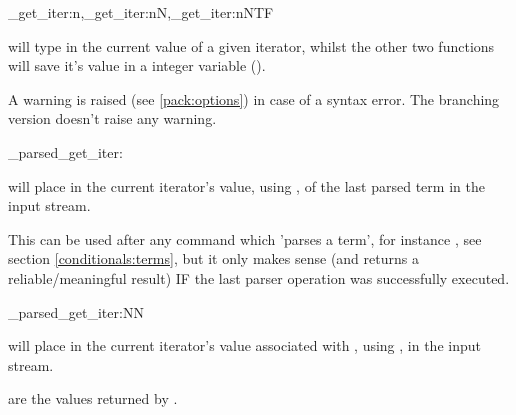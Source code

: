 \documentclass[10pt]{article}
\begin{document}
\begin{codedescribe}{\starray_get_iter:n,\starray_get_iter:nN,\starray_get_iter:nNTF}
\begin{codesyntax}%
\end{codesyntax}
\end{codedescribe}
 will type in the current value of a given iterator, whilst the other two functions will save it's value in a integer variable ().
\begin{tsremark}
A warning is raised (see \ref{pack:options}) in case of a  syntax error. The branching version doesn't raise any warning.
\end{tsremark}

\begin{codedescribe}[code,EXP,new=2023/05/20]{\starray_parsed_get_iter:}
\begin{codesyntax}%
\end{codesyntax}
 will place in the current iterator's value,  using , of the last parsed term in the input stream.
\end{codedescribe}
\begin{tsremark}
This can be used after any command which 'parses a term', for instance , see section \ref{conditionals:terms}, but it only makes sense (and returns a reliable/meaningful result) IF the last parser operation was successfully executed.
\end{tsremark}

\begin{codedescribe}[code,EXP,new=2023/11/28]{\starray_parsed_get_iter:NN}
\begin{codesyntax}%
\end{codesyntax}
 will place in the current iterator's value associated with ,  using , in the input stream.
\end{codedescribe}
\begin{tsremark}
 are the values returned by .
\end{tsremark}
\end{document}
